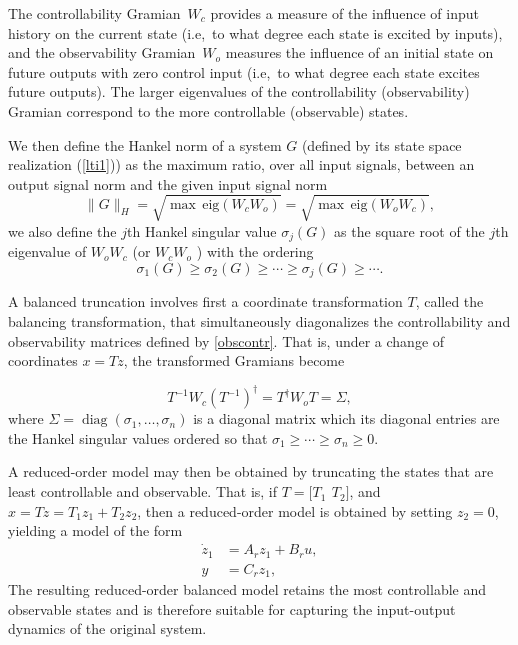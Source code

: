 \documentclass[12pt,lot, lof]{puthesis}
\begin{document}
 The controllability Gramian~$W_c$ provides a measure of the influence of input history on the current state (i.e,\ to what degree each state is excited by inputs), and the observability  Gramian~$W_o$ measures the influence of an initial state on future outputs with zero control input (i.e,\ to what degree each state excites future outputs). The larger eigenvalues of the controllability (observability) Gramian correspond to the more controllable (observable) states.

We then define the Hankel norm of a system $G$ (defined by its state space realization (\ref{lti1})) as the maximum ratio, over all input signals, between an output signal norm and the given input signal norm
\begin{equation}
\| G \|_H = \sqrt{ \max \, \text{eig}(W_c W_o) } = \sqrt{ \max \, \text{eig}(W_o W_c) },
\end{equation}
we also define the $j$th Hankel singular value $\sigma_j (G)$ as the square root of the $j$th eigenvalue of $W_o W_c$ (or $W_c W_o$ ) with the ordering
\[
	\sigma_1(G) \ge   \sigma_2(G) \ge \cdots \ge \sigma_j (G) \ge \cdots.
\]


A balanced truncation involves first a coordinate transformation $T$, called the balancing transformation, that simultaneously diagonalizes the controllability and observability matrices defined by \eqref{obscontr}.  That is, under a change of coordinates $x=Tz$, the transformed Gramians become

\begin{equation}
T^{-1} W_c ( T^{-1} )^\dagger = T^{\dagger} W_o  T = \Sigma,
\end{equation}
where $\Sigma = \operatorname{diag}(\sigma_1,\ldots,\sigma_n)$ is a diagonal matrix which its diagonal entries are the Hankel singular values ordered so that $\sigma_1 \ge \cdots \ge \sigma_n \ge 0$.

A reduced-order model may then be obtained by truncating the states that are least controllable and observable.  That is, if $T = \bigl[ T_1\ \,T_2 \bigr]$, and $x = Tz = T_1 z_1 + T_2 z_2$, then a reduced-order model is obtained by setting $z_2=0$, yielding a model of the form
\begin{equation}
\label{redz2}
\begin{aligned}
	\dot{z}_1 &= A_r z_1  + B_r u,   \\
	y &= C_r z_1 ,
\end{aligned}
\end{equation}
The resulting reduced-order balanced model retains the most controllable and observable states and is therefore suitable for capturing the input-output dynamics of the original system.
\end{document}
